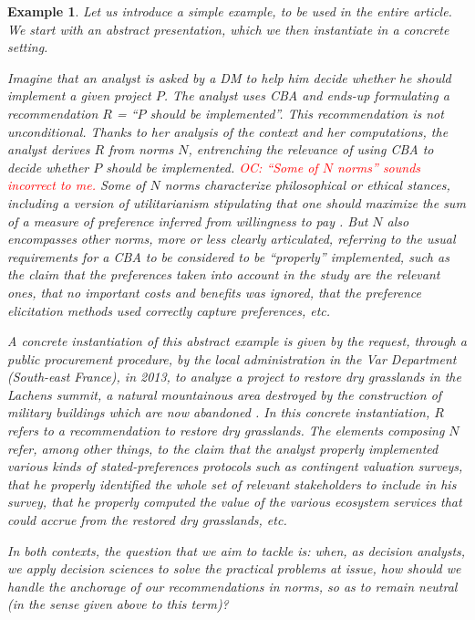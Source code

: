 \documentclass[preprint, french, english, 11pt, authoryear]{elsarticle}%
\newtheorem{example}{Example}
\newcommand{\commentOC}[1]{\textcolor{red}{OC: #1}}
\begin{document}
\begin{example}
Let us introduce a simple example, to be used in the entire article. %
We start with an abstract presentation, which we then instantiate in a concrete setting.

Imagine that an analyst is asked by a \ac{DM} to help him decide whether he should implement a given project $P$.
The analyst uses \ac{CBA} \citep{layard_cost-benefit_1994} and ends-up formulating a recommendation $R$ = “$P$ should be implemented”.
This recommendation is not unconditional.
Thanks to her analysis of the context and her computations, the analyst derives $R$ from norms $N$, entrenching the relevance of using \ac{CBA} to decide whether $P$ should be implemented.
\commentOC{“Some of $N$ norms” sounds incorrect to me.} Some of $N$ norms characterize philosophical or ethical stances, including a version of utilitarianism stipulating that one should maximize the sum of a measure of preference inferred from willingness to pay \citep{meinard_ethical_2016}. 
But $N$ also encompasses other norms, more or less clearly articulated, referring to the usual requirements for a \ac{CBA} to be considered to be ``properly'' implemented, such as the claim that the preferences taken into account in the study are the relevant ones,
that no important costs and benefits was ignored, that the preference elicitation methods used correctly capture preferences, etc.

A concrete instantiation of this abstract example is given by the request, through a public procurement procedure, by the local administration in the Var Department (South-east France), in 2013, to analyze a project to restore dry grasslands in the Lachens summit, a natural mountainous area destroyed by the construction of military buildings which are now abandoned \citep{meinard_etude_2015}.
In this concrete instantiation, $R$ refers to a recommendation to restore dry grasslands. 
The elements composing $N$ refer, among other things, to the claim that the analyst properly implemented various kinds of stated-preferences protocols such as contingent valuation surveys, that he properly identified the whole set of relevant stakeholders to include in his survey, that he properly computed the value of the various ecosystem services that could accrue from the restored dry grasslands, etc.

In both contexts, the question that we aim to tackle is: when, as decision analysts, we apply decision sciences to solve the practical problems at issue, how should we handle the anchorage of our recommendations in norms, so as to remain neutral (in the sense given above to this term)?
\end{example}
\end{document}
